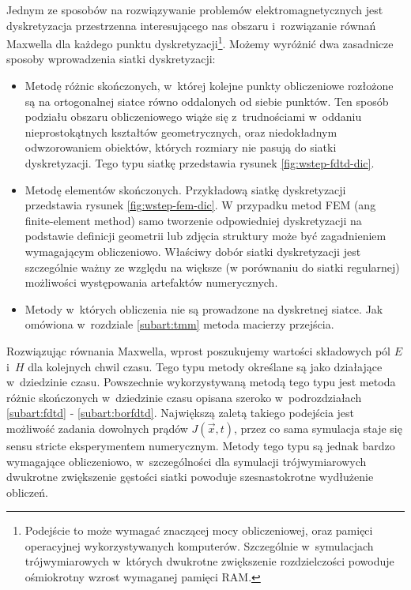 Jednym ze sposobów na rozwiązywanie problemów elektromagnetycznych jest dyskretyzacja przestrzenna interesującego nas obszaru i~rozwiązanie równań Maxwella dla każdego punktu dyskretyzacji\footnote{Podejście to może wymagać znaczącej mocy obliczeniowej, oraz pamięci operacyjnej wykorzystywanych komputerów. Szczególnie w~symulacjach trójwymiarowych w~których dwukrotne zwiększenie rozdzielczości powoduje ośmiokrotny wzrost wymaganej pamięci RAM. }. Możemy wyróżnić dwa zasadnicze sposoby wprowadzenia siatki dyskretyzacji:
\begin{itemize}
\item Metodę różnic skończonych, w~której kolejne punkty obliczeniowe rozłożone są na ortogonalnej siatce równo oddalonych od siebie punktów. Ten sposób podziału obszaru obliczeniowego wiąże się z~trudnościami w~oddaniu nieprostokątnych kształtów geometrycznych, oraz niedokładnym odwzorowaniem obiektów, których rozmiary nie pasują do siatki dyskretyzacji. Tego typu siatkę przedstawia rysunek \ref{fig:wstep-fdtd-dic}.
\item Metodę elementów skończonych. Przykładową siatkę dyskretyzacji przedstawia rysunek \ref{fig:wstep-fem-dic}. W przypadku metod  FEM (ang finite-element method) samo tworzenie odpowiedniej dyskretyzacji na podstawie definicji geometrii lub zdjęcia struktury może być zagadnieniem wymagającym obliczeniowo. Właściwy dobór siatki dyskretyzacji jest szczególnie ważny ze względu na większe (w porównaniu do siatki regularnej) możliwości występowania artefaktów numerycznych.  
\item Metody w~których obliczenia nie są prowadzone na dyskretnej siatce. Jak omówiona w~rozdziale \ref{subart:tmm} metoda macierzy przejścia.
\end{itemize}

Rozwiązując równania Maxwella, wprost poszukujemy wartości składowych pól $E$ i~$H$ dla kolejnych chwil czasu. Tego typu metody określane są jako działające w~dziedzinie czasu. Powszechnie wykorzystywaną metodą tego typu jest metoda różnic skończonych w~dziedzinie czasu opisana szeroko w~podrozdziałach \ref{subart:fdtd} - \ref{subart:borfdtd}. Największą zaletą takiego podejścia jest możliwość zadania dowolnych prądów $J(\vec{x},t)$, przez co sama symulacja staje się sensu stricte eksperymentem numerycznym. Metody tego typu są jednak bardzo wymagające obliczeniowo, w~szczególności dla symulacji trójwymiarowych dwukrotne zwiększenie gęstości siatki powoduje szesnastokrotne wydłużenie obliczeń. 

